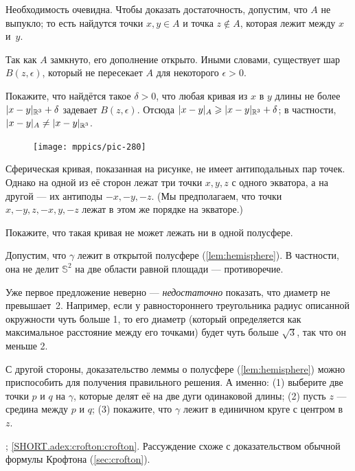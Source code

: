 \begin{multicols}{2}
Необходимость очевидна.
Чтобы доказать достаточность, допустим, что $A$ не выпукло;
то есть найдутся точки $x,y\in A$ и точка $z\notin A$, которая лежит между $x$ и~$y$.

Так как $A$ замкнуто, его дополнение открыто.
Иными словами, существует шар $B(z,\epsilon)$, который не пересекает $A$ для некоторого $\epsilon>0$.

Покажите, что найдётся такое $\delta>0$, что любая кривая из $x$ в $y$ длины не более $\dist{x}{y}{\mathbb{R}^3}+\delta$ задевает $B(z,\epsilon)$.
Отсюда $\dist{x}{y}A\z\ge \dist{x}{y}{\mathbb{R}^3}+\delta$; 
в частности, $\dist{x}{y}A\ne \dist{x}{y}{\mathbb{R}^3}$.

\begin{figure}
\vskip-4mm
\centering
\texttt{[image: mppics/pic-280]}
\vskip0mm
\end{figure}

Сферическая кривая, показанная на рисунке, не имеет антиподальных пар точек.
Однако на одной из её сторон лежат три точки $x,y,z$ с одного экватора, а на другой --- их антиподы $-x,-y,-z$.
(Мы предполагаем, что точки $x,-y,z,-x,y,-z$ лежат в этом же порядке на экваторе.)

Покажите, что такая кривая не может лежать ни в одной полусфере.

Допустим, что $\gamma$ лежит в открытой полусфере (\ref{lem:hemisphere}).
В частности, она не делит $\mathbb{S}^2$ на две области равной площади --- противоречие.

Уже первое предложение неверно --- \textit{недостаточно} показать, что диаметр не превышает~2.
Например, если у равностороннего треугольника радиус описанной окружности чуть больше 1,
то его диаметр (который определяется как максимальное расстояние между его точками) будет чуть больше $\sqrt3$, так что он меньше 2.

С другой стороны, доказательство леммы о полусфере (\ref{lem:hemisphere}) можно приспособить для получения правильного решения.
А именно: (1) выберите две точки $p$ и $q$ на $\gamma$, которые делят её на две дуги одинаковой длины;
(2) пусть $z$ --- средина между $p$ и $q$;
(3) покажите, что $\gamma$ лежит в единичном круге с центром в~$z$.

\parbf{\ref{adex:crofton}}; \ref{SHORT.adex:crofton:crofton}.
Рассуждение схоже с доказательством обычной формулы Крофтона (\ref{sec:crofton}).


\end{multicols}
